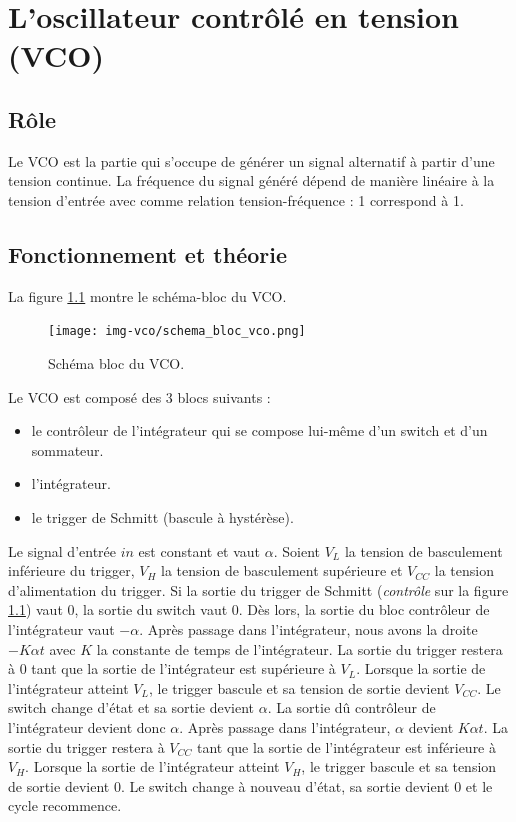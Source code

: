 \chapter{L'oscillateur contrôlé en tension (VCO)}
\section{Rôle}
Le VCO est la partie qui s'occupe de générer un signal alternatif à partir d'une tension continue. La fréquence du signal généré dépend de manière linéaire à la tension d'entrée avec comme relation tension-fréquence : \unit{1}{\milli\volt} correspond à \unit{1}{\hertz}.
\section{Fonctionnement et théorie}
La figure \ref{fig:schema_bloc_vco} montre le schéma-bloc du VCO.

\begin{figure}[ht]
	\centering
	\texttt{[image: img-vco/schema\_bloc\_vco.png]}
	\caption{Schéma bloc du VCO.}
	\label{fig:schema_bloc_vco}
\end{figure}

Le VCO est composé des 3 blocs suivants :
\begin{itemize}
	\item le contrôleur de l'intégrateur qui se compose lui-même d'un switch et d'un sommateur.
	\item l'intégrateur.
	\item le trigger de Schmitt (bascule à hystérèse).
\end{itemize}

Le signal d'entrée $in$ est constant et vaut $\alpha$. Soient $V_L$ la
tension de basculement inférieure du trigger, $V_H$ la tension de 
basculement supérieure et $V_{CC}$ la tension d'alimentation du trigger.
Si la sortie du trigger de Schmitt (\textit{contrôle} sur la figure \ref{fig:schema_bloc_vco}) 
vaut $0$, la sortie du switch vaut $0$. Dès lors, la sortie du bloc contrôleur de l'intégrateur vaut $-\alpha$. Après passage dans l'intégrateur, nous avons la 
droite $-K\alpha t$ avec $K$ la constante de temps de l'intégrateur. La sortie du trigger
restera à $0$ tant que la sortie de l'intégrateur est supérieure à $V_L$. Lorsque la sortie
de l'intégrateur atteint $V_L$, le trigger bascule et sa tension de sortie devient $V_{CC}$. 
Le switch change d'état et sa sortie devient $\alpha$. La sortie dû contrôleur de l'intégrateur
devient donc $\alpha$. Après passage dans l'intégrateur, $\alpha$ devient $K\alpha t$. 
La sortie du trigger restera à $V_{CC}$ tant que la sortie de l'intégrateur est inférieure à $V_H$.
Lorsque la sortie de l'intégrateur atteint $V_H$, le trigger bascule et sa tension de sortie devient
$0$. Le switch change à nouveau d'état, sa sortie devient $0$ et le cycle recommence.

